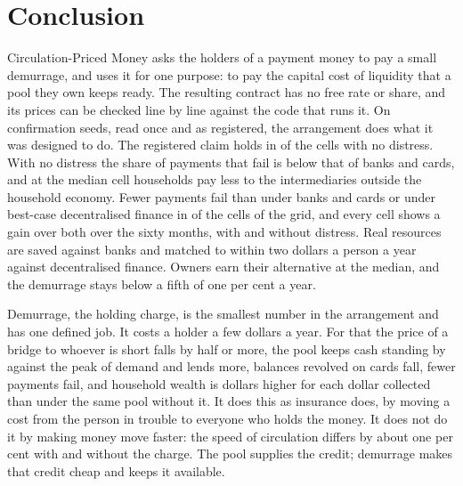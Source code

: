 \documentclass[10pt,a4paper]{article}
\theoremstyle{remark}
\let\savedsection\section
\renewcommand{\section}{\FloatBarrier\savedsection}
\begin{document}





\section{Conclusion}
\label{sec:conclusion}
Circulation-Priced Money asks the holders of a payment money to pay a small
demurrage, and uses it for one purpose: to pay the capital cost of liquidity
that a pool they own keeps ready. The resulting contract
has no free rate or share, and its prices can be checked line by line against
the code that runs it. On \NumSeeds{} confirmation seeds, read once and as
registered, the arrangement does what it was designed to do. The registered
claim holds in \RegionCellsZero{} of the \CellsNoDistress{} cells with no
distress. With no distress the share of payments that fail is
\FailCutBanks{} below that of banks and cards, and at the median cell
households pay \OutsideCutBanks{} less to the intermediaries outside the
household economy. Fewer payments fail
than under banks and cards or under best-case
decentralised finance in \CellsFewerFailures{} of the \CellsAll{} cells of
the grid, and every cell shows a gain over both over the sixty months, with and
without distress. Real
resources are saved against banks and matched to within two dollars a person
a year against decentralised finance. Owners earn their alternative at the
median, and the
demurrage stays below a fifth of one per cent a year.

Demurrage, the holding charge, is the smallest number in the arrangement and has one
defined job. It costs a holder a few dollars a year. For that the price of a
bridge to whoever is short falls by half or more, the pool keeps cash
standing by against the peak of demand and lends more, balances revolved on
cards fall, fewer payments fail, and household wealth is
\GainPerChargeDollar{} dollars higher for each dollar collected than under the
same pool without it. It does this as insurance does, by moving a
cost from the person in trouble to everyone who holds the money. It does not
do it by making money move faster: the speed of circulation differs by about
one per cent with and without the charge. The pool supplies the credit; demurrage
makes that credit cheap and keeps it available.
\end{document}
